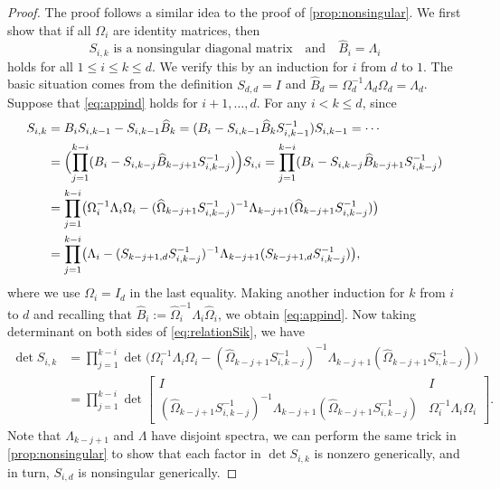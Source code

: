 \documentclass{article}
\newcommand{\defi}{:=}
\begin{document}
\begin{proof}
    The proof follows a similar idea to the proof of \cref{prop:nonsingular}.
    We first show that if all $\Omega_{i}$ are identity matrices, then 
    \begin{equation}
        \label{eq:appind}
        S_{i,k} \text{ is a nonsingular diagonal matrix}\quad\text{and}\quad \widehat{B}_{i}=\Lambda_{i} 
    \end{equation}
    holds for all $1\leq i\leq k\leq d$.
    We verify this by an induction for $i$ from $d$ to $1$. The basic situation comes from the definition $S_{d,d}=I$ and $\widehat{B}_{d}=\Omega_{d}^{-1}\Lambda_{d}\Omega_{d}=\Lambda_{d}$. Suppose that \cref{eq:appind} holds for $i+1,\dotsc,d$.
    For any $i< k\leq d$, since 
    \begin{equation}
        \label{eq:relationSik}
        \begin{aligned}
            S_{i,k} &= B_{i}S_{i,k-1}-S_{i,k-1}\widehat{B}_{k} = (B_{i}-S_{i,k-1}\widehat{B}_{k}S_{i,k-1}^{-1})S_{i,k-1}= \dotsb \\ 
            &= \Bigl(\prod_{j=1}^{k-i}(B_{i}-S_{i,k-j}\widehat{B}_{k-j+1}S_{i,k-j}^{-1})\Bigr)S_{i,i} 
            = \prod_{j=1}^{k-i}(B_{i}-S_{i,k-j}\widehat{B}_{k-j+1}S_{i,k-j}^{-1}) 
            \\ 
            & = \prod_{j=1}^{k-i}\bigl(\Omega_{i}^{-1}\Lambda_{i}\Omega_{i}-(\widehat{\Omega}_{k-j+1}S_{i,k-j}^{-1})^{-1}\Lambda_{k-j+1}(\widehat{\Omega}_{k-j+1}S_{i,k-j}^{-1})\bigr)\\ 
            & = \prod_{j=1}^{k-i}\bigl(\Lambda_{i}-(S_{k-j+1,d}S_{i,k-j}^{-1})^{-1}\Lambda_{k-j+1}(S_{k-j+1,d}S_{i,k-j}^{-1})\bigr),
        \end{aligned}
    \end{equation}
    where we use $\Omega_{i}=I_{d}$ in the last equality. 
    Making another induction for $k$ from $i$ to $d$ and recalling that $\widehat{B}_{i}\defi \widehat{\Omega}_{i}^{-1}\Lambda_{i}\widehat{\Omega}_{i}$, we obtain \cref{eq:appind}.
    Now taking determinant on both sides of \cref{eq:relationSik}, we have 
    \begin{equation*}
        \begin{aligned}
            \det S_{i,k} &= \prod_{j=1}^{k-i}\det \bigl(\Omega_{i}^{-1}\Lambda_{i}\Omega_{i}-(\widehat{\Omega}_{k-j+1}S_{i,k-j}^{-1})^{-1}\Lambda_{k-j+1}(\widehat{\Omega}_{k-j+1}S_{i,k-j}^{-1})\bigr)\\ 
            &= \prod_{j=1}^{k-i}\det \begin{bmatrix}
                I & I \\ 
                (\widehat{\Omega}_{k-j+1}S_{i,k-j}^{-1})^{-1}\Lambda_{k-j+1}(\widehat{\Omega}_{k-j+1}S_{i,k-j}^{-1})
                & \Omega_{i}^{-1}\Lambda_{i}\Omega_{i}
            \end{bmatrix}.
        \end{aligned}
    \end{equation*}
    Note that $\Lambda_{k-j+1}$ and $\Lambda$ have disjoint spectra, we can perform the same trick in \cref{prop:nonsingular} to show that each factor in $\det S_{i,k}$ is nonzero generically, and in turn, $S_{i,d}$ is nonsingular generically.
\end{proof}
\end{document}
